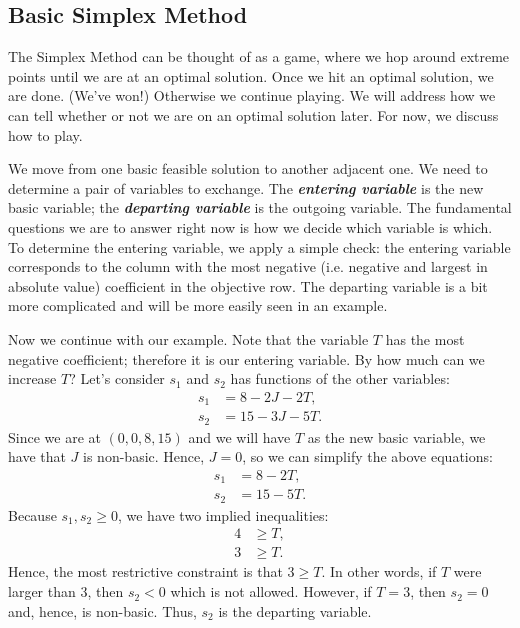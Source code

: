 \documentclass[a4paper, 12pt]{article}
\numberwithin{equation}{section}
\numberwithin{figure}{section}
\theoremstyle{definition}
\renewcommand{\geq}{\geqslant}
\newcommand{\define}[1]{\textbf{\textit{#1}}}
\begin{document}
\subsection{Basic Simplex Method}\label{sec:simplex-method}

The Simplex Method can be thought of as a game, where we hop around extreme
points until we are at an optimal solution. Once we hit an optimal solution, we
are done. (We've won!) Otherwise we continue playing. We will address how we can
tell whether or not we are on an optimal solution later. For now, we discuss how
to play.

We move from one basic feasible solution to another adjacent one. We need to
determine a pair of variables to exchange. The \define{entering variable} is the
new basic variable; the \define{departing variable} is the outgoing variable.
The fundamental questions we are to answer right now is how we decide which
variable is which. To determine the entering variable, we apply a simple check:
the entering variable corresponds to the column with the most negative (i.e.
negative and largest in absolute value) coefficient in the objective row. The
departing variable is a bit more complicated and will be more easily seen in an
example.

Now we continue with our example. Note that the variable $T$ has the most
negative coefficient; therefore it is our entering variable. By how much can we
increase $T$? Let's consider $s_1$ and $s_2$ has functions of the other
variables:
\begin{align*}
	s_1 &= 8 - 2J - 2T, \\
	s_2 &= 15 - 3J - 5T. 
\end{align*}
Since we are at $(0,0,8,15)$ and we will have $T$ as the new basic variable, we
have that $J$ is non-basic. Hence, $J=0$, so we can simplify the above
equations:
\begin{align*}
	s_1 &= 8 - 2T, \\
	s_2 &= 15 - 5T. 
\end{align*}
Because $s_1,s_2\geq 0$, we have two implied inequalities:
\begin{equation}\label{eqn:theta-ratios}
	\begin{split}
		4 &\geq T, \\
		3 &\geq T. 	
	\end{split}
\end{equation}
Hence, the most restrictive constraint is that $3\geq T$. In other words, if $T$
were larger than $3$, then $s_2<0$ which is not allowed. However, if $T=3$, then
$s_2=0$ and, hence, is non-basic. Thus, $s_2$ is the departing variable.
\end{document}
